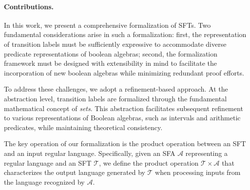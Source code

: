 

\paragraph{Contributions.} 
In this work, we present a comprehensive formalization of SFTs. 
Two fundamental considerations arise in such a formalization: first, the 
representation of transition labels must be sufficiently expressive to accommodate diverse predicate representations of boolean algebras; second, the formalization framework must be designed with extensibility in mind to facilitate the incorporation of new boolean algebras while minimizing redundant proof efforts.

To address these challenges, %
we adopt a refinement-based approach. At the abstraction level, transition labels are formalized through the fundamental mathematical concept of \emph{sets}. This abstraction facilitates subsequent refinement to various representations of Boolean algebras, such as intervals and arithmetic predicates, while maintaining theoretical consistency.

The key operation of our formalization is the product operation between an SFT and an input regular language. Specifically, given an SFA $\mathcal{A}$ representing a regular language and an SFT $\mathcal{T}$, we define the product operation $\mathcal{T} \times\mathcal{A}$ that characterizes the output language generated by $\mathcal{T}$ when processing inputs from the language recognized by $\mathcal{A}$.


